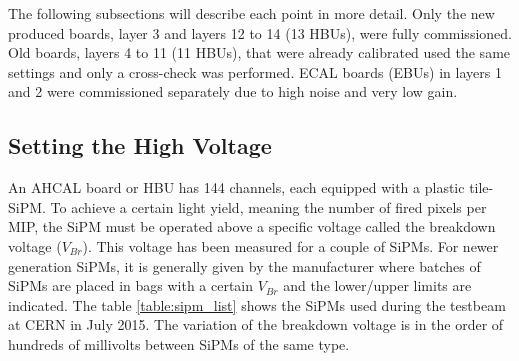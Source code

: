 The following subsections will describe each point in more detail. Only the new produced boards, layer 3 and layers 12 to 14 (13 HBUs), were fully commissioned. Old boards, layers 4 to 11 (11 HBUs), that were already calibrated used the same settings and only a cross-check was performed. ECAL boards (EBUs) in layers 1 and 2 were commissioned separately due to high noise and very low gain.

\subsection{Setting the High Voltage}

\begin{table}[htb!]
  \centering
  \caption{List of the different SiPMs used in the CALICE AHCAL in July 2015.}
  \label{table:sipm_list}
\end{table}

An AHCAL board or HBU has 144 channels, each equipped with a plastic tile-SiPM. To achieve a certain light yield, meaning the number of fired pixels per MIP, the SiPM must be operated above a specific voltage called the breakdown voltage ($V_{Br}$). This voltage has been measured for a couple of SiPMs. For newer generation SiPMs, it is generally given by the manufacturer where batches of SiPMs are placed in bags with a certain $V_{Br}$ and the lower/upper limits are indicated. The table \ref{table:sipm_list} shows the SiPMs used during the testbeam at CERN in July 2015. The variation of the breakdown voltage is in the order of hundreds of millivolts between SiPMs of the same type.

